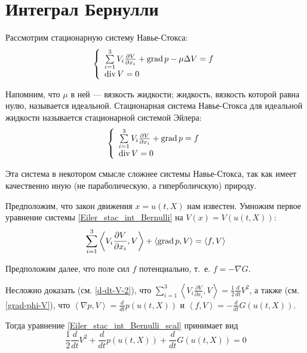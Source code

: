 \section{Интеграл Бернулли}
Рассмотрим стационарную систему Навье-Стокса:
\begin{equation*}
	\left\{
		\begin{array}{l}
		\sum\limits_{i=1}^{3}V_i\frac{\partial V}{\partial x_i}
		+ \operatorname{grad} p - \mu \Delta V = f
		\\
		\operatorname{div} V = 0
		\end{array}
	\right.
\end{equation*}

Напомним, что $\mu$ в ней --- вязкость жидкости;
жидкость, вязкость которой равна нулю, называется идеальной.
Стационарная система Навье-Стокса для идеальной жидкости называется стационарной системой Эйлера:
\begin{equation} \label{Eiler_stac_int_Bernulli}
	\left\{
		\begin{array}{l}
		\sum\limits_{i=1}^{3}V_i\frac{\partial V}{\partial x_i}
		+ \operatorname{grad} p = f
		\\
		\operatorname{div} V = 0
		\end{array}
	\right.
\end{equation}

Эта система в некотором смысле сложнее системы Навье-Стокса,
так как имеет качественно иную (не параболическую, а гиперболичскую) природу.

Предположим, что закон движения $x=u(t,X)$ нам известен.
Умножим первое уравнение системы \eqref{Eiler_stac_int_Bernulli} на $V(x) = V(u(t,X))$:
\begin{equation} \label{Eiler_stac_int_Bernulli_scal}
	\sum\limits_{i=1}^{3}\left<V_i\frac{\partial V}{\partial x_i} , V \right>
	+ \left< \operatorname{grad} p , V \right> = \left< f , V \right>
\end{equation}

Предположим далее, что поле сил $f$ потенциально, т.~е. $f = - \nabla G$.

Несложно доказать (см. \eqref{d-dt-V-2}), что
$\sum\limits_{i=1}^{3} \left< V_i \frac{\partial V}{\partial x_i}, V \right> = \frac{1}{2} \frac{d}{dt}V^2$,
а также (см. \eqref{grad-phi-V}), что
$\left< \nabla p , V\right> = \frac{d}{dt}p (u(t,X))$
и $\left< f , V\right> = - \frac{d}{dt}G (u(t,X))$.

Тогда уравнение \eqref{Eiler_stac_int_Bernulli_scal} принимает вид
\begin{equation*}
	\frac{1}{2} \frac{d}{dt}V^2 + \frac{d}{dt}p (u(t,X)) + \frac{d}{dt}G (u(t,X)) = 0
\end{equation*}

